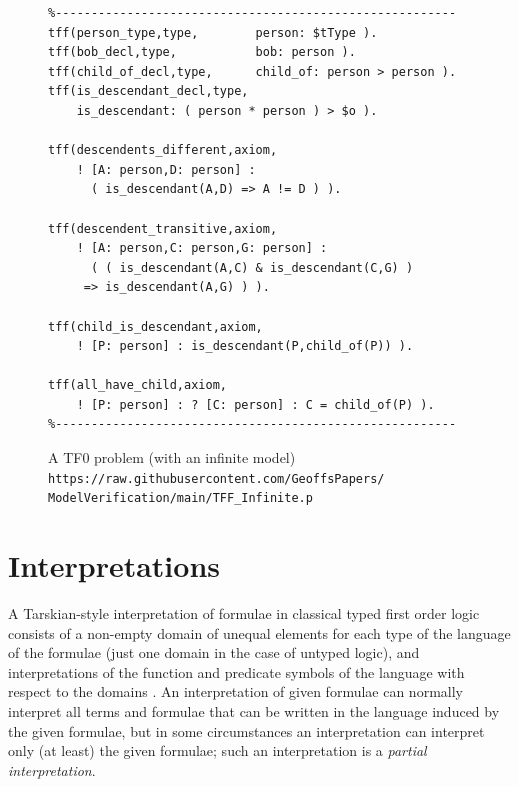 \documentclass[letterpaper]{article}
\begin{document}
\begin{figure}[htbp]
\scriptsize
{}
\begin{verbatim}
%--------------------------------------------------------
tff(person_type,type,        person: $tType ).
tff(bob_decl,type,           bob: person ).
tff(child_of_decl,type,      child_of: person > person ).
tff(is_descendant_decl,type, 
    is_descendant: ( person * person ) > $o ).

tff(descendents_different,axiom,
    ! [A: person,D: person] : 
      ( is_descendant(A,D) => A != D ) ).

tff(descendent_transitive,axiom,
    ! [A: person,C: person,G: person] :
      ( ( is_descendant(A,C) & is_descendant(C,G) ) 
     => is_descendant(A,G) ) ).

tff(child_is_descendant,axiom,
    ! [P: person] : is_descendant(P,child_of(P)) ).

tff(all_have_child,axiom,
    ! [P: person] : ? [C: person] : C = child_of(P) ).
%--------------------------------------------------------
\end{verbatim}
\caption{A TF0 problem (with an infinite model)\\
{\scriptsize {\tt https://raw.githubusercontent.com/GeoffsPapers/\\
ModelVerification/main/TFF\_Infinite.p}}}
\label{TF0InfiniteProblem}
\end{figure}


\section{Interpretations}
\label{Interpretations}

A Tarskian-style \cite{TV56} interpretation of formulae in classical typed first order logic 
consists of a non-empty domain of unequal elements for each type of the language of the formulae 
(just one domain in the case of untyped logic), and interpretations of the function and predicate 
symbols of the language with respect to the domains \cite{Hun96}.
An interpretation of given formulae can normally interpret all terms and formulae that can be 
written in the language induced by the given formulae, but in some circumstances an interpretation 
can interpret only (at least) the given formulae; such an interpretation is a {\em partial
interpretation}.
\end{document}
